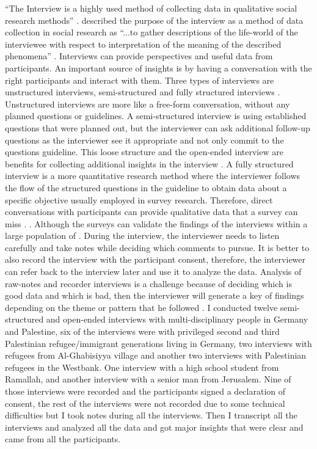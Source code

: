 “The Interview is a highly used method of collecting data in qualitative social research methods” \citep{Anyan2013}. \cite{Kvale1983} described the purpose of the interview as a method of data collection in social research as “...to gather descriptions of the life-world of the interviewee with respect to interpretation of the meaning of the described phenomena” \cite[p.174]{Kvale1983}. Interviews can provide perspectives and useful data from participants. An important source of insights is by having a conversation with the right participants and interact with them. 
Three types of interviews are unstructured interviews, semi-structured and fully structured interviews \citep{Lazar2017ResearchInteraction}. Unstructured interviews are more like a free-form conversation, without any planned questions or guidelines. A semi-structured interview is using established questions that were planned out, but the interviewer can ask additional follow-up questions as the interviewer see it appropriate and not only commit to the questions guideline. This loose structure and the open-ended interview are benefits for collecting additional insights in the interview \citep{Pannafino2017UXMethods}. A fully structured interview is a more quantitative research method where the interviewer follows the flow of the structured questions in the guideline to obtain data about a specific objective usually employed in survey research. Therefore, direct conversations with participants can provide qualitative data that a survey can miss \citep{Lazar2017ResearchInteraction}.  \cite [p.187]{Lazar2017ResearchInteraction}. Although the surveys can validate the findings of the interviews within a large population of \citep{Pannafino2017UXMethods}. During the interview, the interviewer needs to listen carefully and take notes while deciding which comments to pursue. It is better to also record the interview with the participant consent, therefore, the interviewer can refer back to the interview later and use it to analyze the data. Analysis of raw-notes and recorder interviews is a challenge because of deciding which is good data and which is bad, then the interviewer will generate a key of findings depending on the theme or pattern that he followed \citep{Lazar2017ResearchInteraction, Pannafino2017UXMethods}.
I conducted twelve semi-structured and open-ended interviews with multi-disciplinary people in Germany and Palestine, six of the interviews were with privileged second and third Palestinian refugee/immigrant generations living in Germany, two interviews with refugees from Al-Ghabisiyya village and another two interviews with Palestinian refugees in the Westbank. One interview with a high school student from Ramallah, and another interview with a senior man from Jerusalem. Nine of those interviews were recorded and the participants signed a declaration of consent, the rest of the interviews were not recorded due to some technical difficulties but I took notes during all the interviews. Then I transcript all the interviews and analyzed all the data and got major insights that were clear and came from all the participants.           

